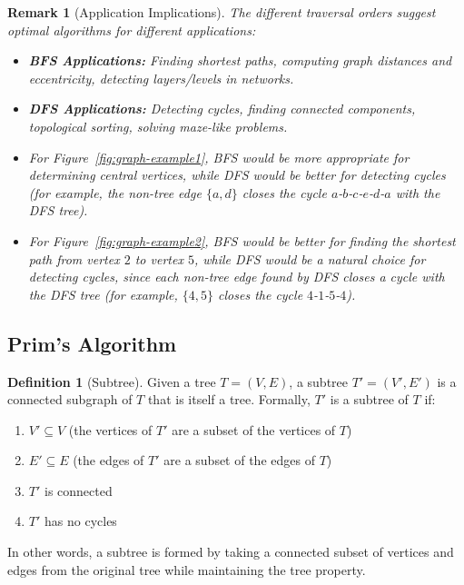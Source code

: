 \documentclass{article}
\newtheorem{remark}{Remark}
\theoremstyle{definition}
\newtheorem{definition}{Definition}
\begin{document}
\begin{remark}[Application Implications]
The different traversal orders suggest optimal algorithms for different applications:
\begin{itemize}
\item \textbf{BFS Applications:} Finding shortest paths, computing graph distances and eccentricity, detecting layers/levels in networks.

\item \textbf{DFS Applications:} Detecting cycles, finding connected components, topological sorting, solving maze-like problems.

\item For Figure~\ref{fig:graph-example1}, BFS would be more appropriate for determining central vertices, while DFS would be better for detecting cycles (for example, the non-tree edge $\{a,d\}$ closes the cycle $a$-$b$-$c$-$e$-$d$-$a$ with the DFS tree).

\item For Figure~\ref{fig:graph-example2}, BFS would be better for finding the shortest path from vertex $2$ to vertex $5$, while DFS would be a natural choice for detecting cycles, since each non-tree edge found by DFS closes a cycle with the DFS tree (for example, $\{4,5\}$ closes the cycle $4$-$1$-$5$-$4$).
\end{itemize}
\end{remark}

\pagebreak
\subsection{Prim's Algorithm}\label{subsec:prim}

\begin{definition}[Subtree]
Given a tree $T = (V, E)$, a subtree $T' = (V', E')$ is a connected subgraph of $T$ that is itself a tree. Formally, $T'$ is a subtree of $T$ if:
\begin{enumerate}
\item $V' \subseteq V$ (the vertices of $T'$ are a subset of the vertices of $T$)
\item $E' \subseteq E$ (the edges of $T'$ are a subset of the edges of $T$)
\item $T'$ is connected
\item $T'$ has no cycles
\end{enumerate}
In other words, a subtree is formed by taking a connected subset of vertices and edges from the original tree while maintaining the tree property.
\end{definition}
\end{document}

